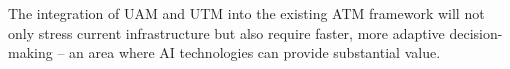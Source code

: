 

The integration of \gls{UAM} and \gls{UTM} into the existing \gls{ATM} framework will not only stress current infrastructure but also require faster, more adaptive decision-making \cite{Rumba_2020} -- an area where \gls{AI} technologies can provide substantial value.



